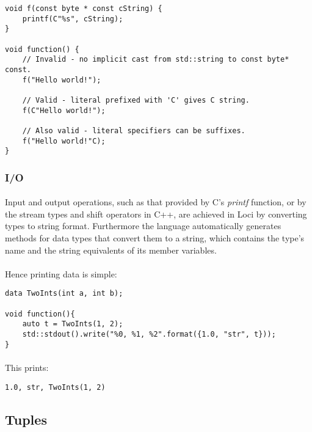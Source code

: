 \documentclass[12pt,twoside,notitlepage]{report}
\begin{document}
\begin{lstlisting}
void f(const byte * const cString) {
	printf(C"%s", cString);
}

void function() {
	// Invalid - no implicit cast from std::string to const byte* const.
	f("Hello world!");
	
	// Valid - literal prefixed with 'C' gives C string.
	f(C"Hello world!");
	
	// Also valid - literal specifiers can be suffixes.
	f("Hello world!"C);
}
\end{lstlisting}

\subsubsection{I/O}

\paragraph{}
Input and output operations, such as that provided by C's \emph{printf} function, or by the stream types and shift operators in C++, are achieved in Loci by converting types to string format. Furthermore the language automatically generates methods for data types that convert them to a string, which contains the type's name and the string equivalents of its member variables.

\paragraph{}
Hence printing data is simple:

\begin{lstlisting}
data TwoInts(int a, int b);

void function(){
	auto t = TwoInts(1, 2);
	std::stdout().write("%0, %1, %2".format({1.0, "str", t}));
}
\end{lstlisting}

\paragraph{}
This prints:

\begin{verbatim}
1.0, str, TwoInts(1, 2)
\end{verbatim}

\subsection{Tuples}
\end{document}
